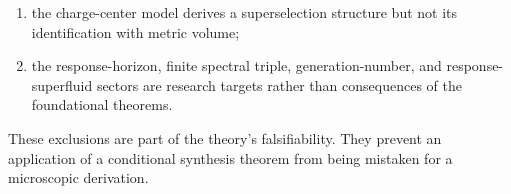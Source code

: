 \begin{enumerate}
only a direct mixture of scalar laws; its positive noncentral normalized
control fails DGC.  These results do not derive the internal
commutant, maximal-birth/port language, contact motifs, response multiplet,
coherent arity, or phase.  In particular, the arbitrary-causet construction
retains an external classical CSG law and does not satisfy an operator
Markov sum or the square-operator TOBC/NTOBC/CPOBC conditions, while the
central branch is coherence blind; neither supplies a quantum-backreacting
geometry law.  The companions do not
prove Lorentzian continuum refinement,
spin--statistics or anomaly freedom, absolute Newton constant, or vacuum and
higher-curvature renormalization;
\item the charge-center model derives a superselection structure but not its
identification with metric volume;
\item the response-horizon, finite spectral triple, generation-number, and
response-superfluid sectors are research targets rather than consequences of
the foundational theorems.
\end{enumerate}
These exclusions are part of the theory's falsifiability.  They prevent an
application of a conditional synthesis theorem from being mistaken for a
microscopic derivation.
